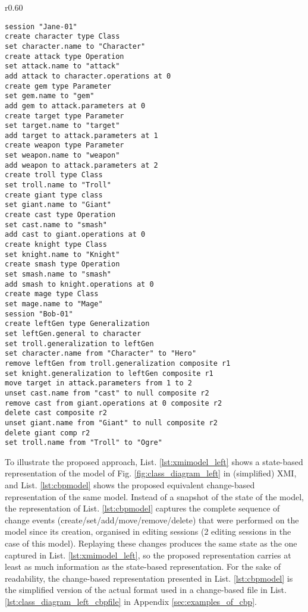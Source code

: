 \begin{wrapfigure}[34]{r}{0.60\textwidth}
\vspace{-12pt}
\begin{lstlisting}[style=eol,caption={Change-based representation of the model in Figure \ref{fig:class_diagram_left}.},label=lst:cbpmodel]
session "Jane-01"
create character type Class
set character.name to "Character" 
create attack type Operation
set attack.name to "attack" 
add attack to character.operations at 0
create gem type Parameter
set gem.name to "gem" 
add gem to attack.parameters at 0
create target type Parameter
set target.name to "target" 
add target to attack.parameters at 1
create weapon type Parameter
set weapon.name to "weapon" 
add weapon to attack.parameters at 2
create troll type Class
set troll.name to "Troll" 
create giant type class
set giant.name to "Giant"
create cast type Operation
set cast.name to "smash"
add cast to giant.operations at 0
create knight type Class
set knight.name to "Knight"
create smash type Operation
set smash.name to "smash"
add smash to knight.operations at 0
create mage type Class
set mage.name to "Mage" 
session "Bob-01"
create leftGen type Generalization
set leftGen.general to character
set troll.generalization to leftGen
set character.name from "Character" to "Hero"
remove leftGen from troll.generalization composite r1
set knight.generalization to leftGen composite r1
move target in attack.parameters from 1 to 2
unset cast.name from "cast" to null composite r2
remove cast from giant.operations at 0 composite r2
delete cast composite r2
unset giant.name from "Giant" to null composite r2
delete giant comp r2
set troll.name from "Troll" to "Ogre"
\end{lstlisting}
\end{wrapfigure}

To illustrate the proposed approach, List. \ref{lst:xmimodel_left} shows a state-based representation of the model of Fig. \ref{fig:class_diagram_left} in (simplified) XMI, and List. \ref{lst:cbpmodel} shows the proposed equivalent change-based representation of the same model. Instead of a snapshot of the state of the model, the representation of List. \ref{lst:cbpmodel} captures the complete sequence of change events (create/set/add/move/remove/delete) that were performed on the model since its creation, organised in editing sessions (2 editing sessions in the case of this model). Replaying these changes produces the same state as the one captured in List. \ref{lst:xmimodel_left}, so the proposed representation carries at least as much information as the state-based representation. For the sake of readability, the change-based representation presented in List. \ref{lst:cbpmodel} is the simplified version of the actual format used in a  change-based file in List. \ref{lst:class_diagram_left_cbpfile} in Appendix \ref{sec:examples_of_cbp}. 

